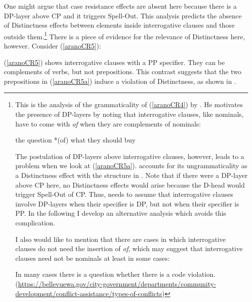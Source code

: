 \documentclass[output=paper]{langscibook}
\begin{document}
One might argue that case resistance effects are absent here because there is a DP-layer above CP and it triggers Spell-Out. This analysis predicts the absence of Distinctness effects between elements inside interrogative clauses and those outside them.\footnote{This is the analysis of the grammaticality of (\ref{aranoCR4}) by \citet[139, 215 fn. 67]{Richards:2010}. He motivates the presence of DP-layers by noting that interrogative clauses, like nominals, have to come with \emph{of} when they are complements of nominals:

\ea 
the question *(of) {\ob}what they should buy{\cb} \\ \upshape \citep[139]{Richards:2010}
\z 

The postulation of  DP-layers above interrogative clauses, however, leads to a problem when we look at (\ref{aranoCR5a}). \citet{Richards:2010} accounts for its ungrammaticality as a Distinctness effect with the structure in . Note that if there were a DP-layer above CP here, no Distinctness effects would arise because the D-head would trigger Spell-Out of CP\@. Thus, \citet{Richards:2010} needs to assume that interrogative clauses involve DP-layers when their specifier is DP, but not when their specifier is PP\@. In the following I develop an alternative analysis which avoids this complication. 

I also would like to mention that there are cases in which interrogative clauses do not need the insertion of \emph{of}, which may suggest that interrogative clauses need not be nominals at least in some cases:

\ea 
In many cases there is a question whether there is a code violation. \\
{\normalfont(\url{https://bellevuewa.gov/city-government/departments/community-development/conflict-assistance/types-of-conflicts})}
\z} There is a piece of evidence for the relevance of Distinctness here, however. Consider (\ref{aranoCR5}):

\ea \label{aranoCR5}
\label{aranoCR5a} 
\z
\z 

\noindent (\ref{aranoCR5}) shows interrogative clauses with a PP specifier. They can be complements of verbs, but not prepositions. This contrast suggests that the two prepositions in (\ref{aranoCR5a}) induce a violation of Distinctness, as shown in .
\end{document}
